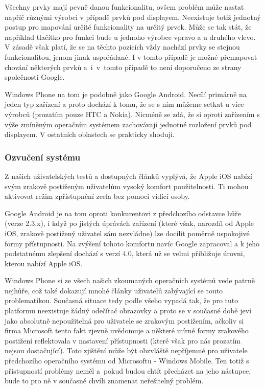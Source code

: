 \documentclass[thesis=M,czech]{FITthesis}[2012/06/26]
\begin{document}
Všechny prvky mají pevně danou funkcionalitu, ovšem problém může nastat napříč různými výrobci v případě prvků pod displayem. Neexistuje totiž jednotný postup pro mapování určité funkcionality na určitý prvek. Může se tak stát, že například tlačítko pro funkci  bude u jednoho výrobce vpravo a u druhého vlevo. V zásadě však platí, že se na těchto pozicích vždy nachází prvky se stejnou funkcionalitou, jenom jinak uspořádané. I v tomto případě je možné přemapovat chování některých prvků a~i~v~tomto případě to není doporučeno ze strany společnosti Google.

Windows Phone na tom je podobně jako Google Android. Necílí primárně na jeden typ zařízení a proto dochází k tomu, že se s ním můžeme setkat u více výrobců (prozatím pouze HTC a Nokia). Nicméně se zdá, že si oproti zařízením s výše zmíněným operačním systémem zachovávají jednotné rozložení prvků pod displayem. V ostatních oblastech se prakticky shodují.

\subsubsection*{Ozvučení systému}
Z našich uživatelských testů a dostupných článků\cite{ipad_blind}\cite{iphone_blind}\cite{iphone_inside} vyplývá, že Apple iOS nabízí svým zrakově postiženým uživatelům vysoký komfort použitelnosti. Ti mohou aktivovat režim zpřístupnění zcela bez pomoci vidící osoby.

Google Android je na tom oproti konkurentovi z předchozího odstavce hůře (verze 2.3.x), i když po jistých úprávách zařízení (které však, narozdíl od Apple iOS, zrakově postižený uživatel sám nezvládne) lze docílit poměrně uspokojivé formy přístupnosti\cite{android_blind}. Na zvýšení tohoto komfortu navíc Google zapracoval a k jeho podstatnému zlepšení dochází s verzí 4.0, která už se velmi přibližuje úrovni, kterou nabízí Apple iOS\cite{android_start}.

Windows Phone si ze všech našich zkoumaných operačních systémů vede patrně nejhůře, což také dokazují mnohé články\cite{touch_yes_or_no}\cite{win8_blind}\cite{win8_blind2} uživatelů zabývající se touto problematikou. Současná situace tedy podle všeho vypadá tak, že pro tuto platformu neexistuje žádný odečítač obrazovky a proto se v současné době jeví jako absolutně nepoužitelná pro uživatele se zrakovým postižením, ačkoliv si firma Microsoft tento fakt zjevně uvědomuje a některé mírné formy zrakového postižení reflektovala v nastavení přístupnosti\cite{win8_no_reader} (které však pro nás prozatím nejsou dostačující). Toto zjištění může být obzvláště nepříjemné pro uživatele předchozího operačního systému od Microsoftu - Windows Mobile. Ten totiž s přístupností problémy neměl a~pokud budou chtít přecházet na jeho nástupce, bude to pro ně v současné chvíli znamenat neřešitelný problém.
\end{document}
